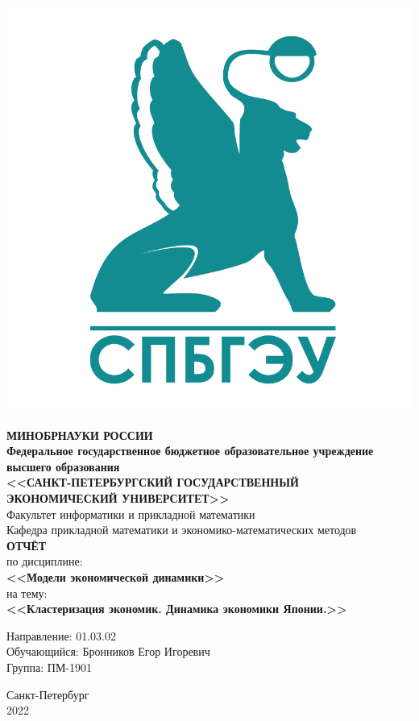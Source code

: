 \documentclass[14pt,fleqn]{extarticle}
\begin{document}
	\begin{titlepage}
		\includegraphics[scale=0.12]{logo}
		\begin{center}
			\textbf{МИНОБРНАУКИ РОССИИ}\\
			\vspace{0.2cm}
			\textbf{Федеральное государственное бюджетное образовательное учреждение высшего образования}\\
			\textbf{<<САНКТ-ПЕТЕРБУРГСКИЙ ГОСУДАРСТВЕННЫЙ ЭКОНОМИЧЕСКИЙ УНИВЕРСИТЕТ>>}\\
			\vspace{0.6cm}
			Факультет информатики и прикладной математики\\
			Кафедра прикладной математики и экономико-математических методов\\
			\vspace{1cm}
			\textbf{ОТЧЁТ}\\
			по дисциплине:\\
			\textbf{<<Модели экономической динамики>>}\\
			на тему:\\
			\textbf{<<Кластеризация экономик. Динамика экономики Японии.>>}\\
		\end{center}
		\vspace{1cm}
		Направление: 01.03.02\\
		Обучающийся: Бронников Егор Игоревич\\
		Группа: ПМ-1901\\
		\vfill
		\begin{center}
			Санкт-Петербург\\
			2022\\
		\end{center}
	\end{titlepage}
\end{document}
